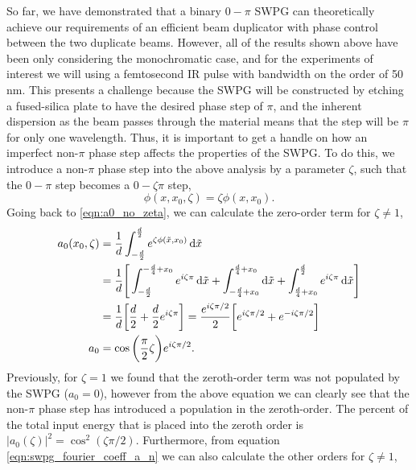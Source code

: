 So far, we have demonstrated that a binary $0-\pi$ SWPG can theoretically achieve our requirements of an efficient beam duplicator with phase control between the two duplicate beams.  However, all of the results shown above have been only considering the monochromatic case, and for the experiments of interest we will using a femtosecond IR pulse with bandwidth on the order of 50 nm.  This presents a challenge because the SWPG will be constructed by etching a fused-silica plate to have the desired phase step of $\pi$, and the inherent dispersion as the beam passes through the material means that the step will be $\pi$ for only one wavelength.  Thus, it is important to get a handle on how an imperfect non-$\pi$ phase step affects the properties of the SWPG.  To do this, we introduce a non-$\pi$ phase step into the above analysis by a parameter $\zeta$, such that the $0-\pi$ step becomes a $0-\zeta\pi$ step,
\begin{equation}
\label{eqn:zeta}
	\phi(x,x_0,\zeta)=\zeta \phi(x,x_0).
\end{equation}
Going back to \ref{eqn:a0_no_zeta}, we can calculate the zero-order term for $\zeta\neq1$,
\begin{equation}
\label{eqn:a_0_zeta}
	\begin{aligned}
	a_0(x_0,\zeta) &= \frac{1}{d}\int_{-\frac{d}{2}}^{\frac{d}{2}} e^{\zeta\phi(\tilde{x},x_0)}\mathop{}\!\mathrm{d}\tilde{x}\\
	&= \frac{1}{d}\Bigg[\int_{-\frac{d}{2}}^{-\frac{d}{4}+x_0}e^{i\zeta\pi}\mathop{}\!\mathrm{d}\tilde{x}
	+ \int_{-\frac{d}{4}+x_0}^{\frac{d}{4}+x_0} \mathop{}\!\mathrm{d}\tilde{x}
	+ \int_{\frac{d}{4}+x_0}^{\frac{d}{2}} e^{i\zeta\pi}\mathop{}\!\mathrm{d}\tilde{x} \Bigg]\\
	&=\frac{1}{d} \bigg[\frac{d}{2} + \frac{d}{2}e^{i\zeta\pi} \bigg] = \frac{e^{i\zeta\pi/2}}{2}\bigg[ e^{i\zeta\pi/2} 
	+ e^{-i\zeta\pi/2}\bigg]\\
	a_0 & = \cos\bigg(\frac{\pi}{2}\zeta\bigg)e^{i\zeta\pi/2}.
	\end{aligned}
\end{equation}
Previously, for $\zeta=1$ we found that the zeroth-order term was not populated by the SWPG ($a_0=0$), however from the above equation we can clearly see that the non-$\pi$ phase step has introduced a population in the zeroth-order.  The percent of the total input energy that is placed into the zeroth order is $\rvert a_0(\zeta)\rvert^2=\cos^2(\zeta\pi/2)$. Furthermore, from equation \ref{eqn:swpg_fourier_coeff_a_n} we can also calculate the other orders for $\zeta\neq1$,
